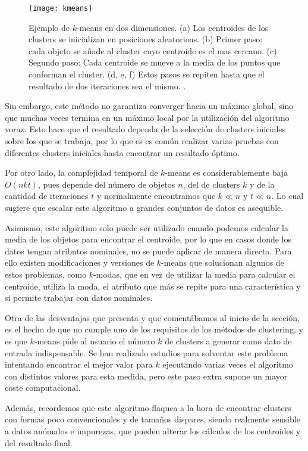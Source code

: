 \documentclass[10pt, a4paper]{article}
\begin{document}
\begin{figure}[ht]
\centering
\texttt{[image: kmeans]}
\caption{Ejemplo de $k$-means en dos dimensiones. (a) Los centroides de los clusters se inicializan en posiciones aleatorioas. (b) Primer paso: cada objeto se añade al cluster cuyo centroide es el mas cercano. (c) Segundo paso: Cada centroide se mueve a la media de los puntos que conforman el cluster. (d, e, f) Estos pasos se repiten hasta que el resultado de dos iteraciones sea el mismo. \cite{kmeansfoto}.}
\label{fig:kmeans}
\end{figure}


Sin embargo, este método no garantiza converger hacia un máximo global, sino que muchas veces termina en un máximo local por la utilización del algoritmo voraz. Esto hace que el resultado dependa de la selección de clusters iniciales sobre los que se trabaja, por lo que es es común realizar varias pruebas con diferentes clusters iniciales hasta encontrar un resultado óptimo. 

Por otro lado, la complejidad temporal de $k$-means es considerablemente baja  $O(nkt)$, pues depende del número de objetos $n$, del de clusters $k$ y de la cantidad de iteraciones $t$ y normalmente encontramos que $k \ll n$ y $t \ll n$. Lo cual sugiere que escalar este algoritmo a grandes conjuntos de datos es asequible.

Asimismo, este algoritmo solo puede ser utilizado cuando podemos calcular la media de los objetos para encontrar el centroide, por lo que en casos donde los datos tengan atributos nominales, no se puede aplicar de manera directa. Para ello existen modificaciones y versiones de $k$-means que solucionan algunos de estos problemas, como $k$-modas, que en vez de utilizar la media para calcular el centroide, utiliza la moda, el atributo que más se repite para una característica y si permite trabajar con datos nominales.

Otra de las desventajas que presenta y que comentábamos al inicio de la sección, es el hecho de que no cumple uno de los requisitos de los métodos de clustering, y es que $k$-means pide al usuario el número $k$ de clusters a generar como dato de entrada indispensable. Se han realizado estudios para solventar este problema intentando encontrar el mejor valor para $k$ ejecutando varias veces el algoritmo con distintos valores para esta medida, pero este paso extra supone un mayor coste computacional. 

Además, recordemos que este algoritmo flaquea a la hora de encontrar clusters con formas poco convencionales y de tamaños dispares, siendo realmente sensible a datos anómalos e impurezas, que pueden alterar los cálculos de los centroides y del resultado final.
\end{document}
